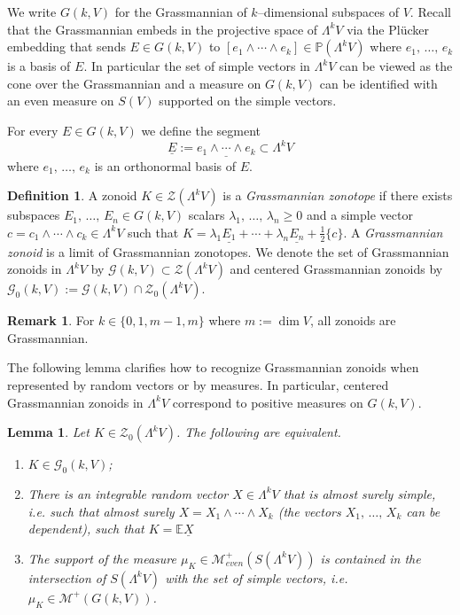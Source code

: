 \documentclass[10pt]{amsart}
\newtheorem{lemm}[theo]{Lemma}\newtheorem{prop}[theo]{Proposition}\newtheorem{coro}[theo]{Corollary}\newtheorem{conj}[theo]{Conjecture}
\theoremstyle{definition}\newtheorem{defi}[theo]{Definition}\newtheorem{rema}[theo]{Remark}\newtheorem{exam}[theo]{Example}\newtheorem{exem}[theo]{Example}\newtheorem{nota}[theo]{Notation}
\newcommand{\PP}{\mathbb{P}}
\newcommand{\EE}{\mathbb{E}}
\newcommand{\ZZ}{\mathscr{Z}}
\newcommand{\ZZo}{\mathscr{Z}_0}
\newcommand{\Me}{\mathcal{M}}
\newcommand{\Mev}{\mathcal{M}_{even}}
\newcommand{\GZ}{\mathcal{G}}
\newcommand{\GZo}{\mathcal{G}_0}
\newcommand{\seg}{\underline}
\newcommand*{\romanenumi}{\renewcommand*{\theenumi}{\roman{enumi}}}
\begin{document}
We write $G(k,V)$ for the Grassmannian of $k$--dimensional subspaces of $V$. Recall that the Grassmannian embeds in the projective space of $\Lambda^kV$ via the Pl\"ucker embedding that sends $E\in G(k,V)$ to $[e_1\wedge\cdots\wedge e_k]\in\PP(\Lambda^kV)$ where $e_1,\,\ldots,\,e_k$ is a basis of $E.$ In particular the set of simple vectors in $\Lambda^kV$ can be viewed as the cone over the Grassmannian and a measure on $G(k,V)$ can be identified with an even measure on $S(V)$ supported on the simple vectors.

For every $E\in G(k,V)$ we define the segment
\begin{equation*}
\seg{E}:=\seg{e_1\wedge\cdots\wedge e_k}\subset\Lambda^k V
\end{equation*}
where $e_1,\,\ldots,\,e_k$ is an orthonormal basis of $E.$

\begin{defi}
A zonoid $K\in\ZZ(\Lambda^k V)$ is a \emph{Grassmannian zonotope} if there exists subspaces $E_1,\,\ldots,\,E_n\in G(k,V)$ scalars $\lambda_1,\,\ldots,\,\lambda_n\geq 0$ and a simple vector $c=c_1\wedge\cdots\wedge c_k\in\Lambda^k V$ such that $K=\lambda_1\seg{E_1}+\cdots+\lambda_n\seg{E_n}+\tfrac{1}{2}\{c\}$. A \emph{Grassmannian zonoid} is a limit of Grassmannian zonotopes. We denote the set of Grassmannian zonoids in $\Lambda^k V$ by $\GZ(k,V)\subset \ZZ(\Lambda^k V)$ and centered Grassmannian zonoids by $\GZo(k,V):=\GZ(k,V)\cap \ZZo(\Lambda^k V)$.
\end{defi}

\begin{rema}
For $k\in\{0,1,m-1,m\}$ where $m:=\dim V$, all zonoids are Grassmannian.
\end{rema}



The following lemma clarifies how to recognize Grassmannian zonoids when represented by random vectors or by measures. In particular, centered Grassmannian zonoids in $\Lambda^k V$ correspond to positive measures on $G(k,V)$.

\begin{lemm}\label{lem:GZchar}
Let $K\in \ZZo(\Lambda^k V)$. The following are equivalent.
\begin{enumerate}\romanenumi
\item\label{lemm3.23.1} $K\in\GZo(k,V)$;
\item\label{lemm3.23.2} There is an integrable random vector $X\in\Lambda^k V$ that is almost surely simple, i.e. such that almost surely $X=X_1\wedge\cdots\wedge X_k$ (the vectors $X_1,\,\ldots,\,X_k$ can be \emph{dependent}), such that $K=\EE\seg{X}$
\item\label{lemm3.23.3} The support of the measure $\mu_K\in\Mev^+(S(\Lambda^kV))$ is contained in the intersection of $S(\Lambda^kV)$ with the set of simple vectors, i.e. $\mu_K\in\Me^+(G(k,V))$.
\end{enumerate}
\end{lemm}
\end{document}
